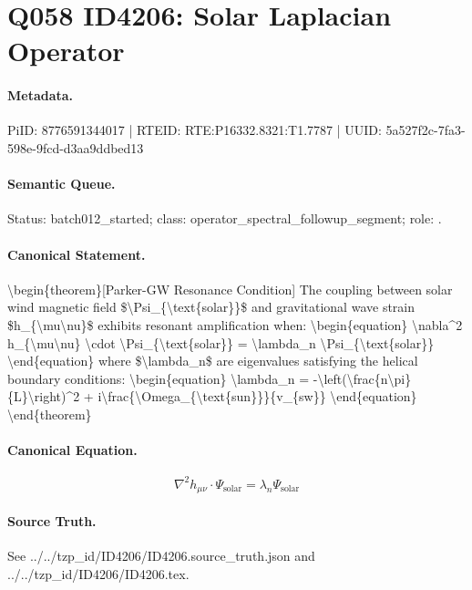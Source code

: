 \section*{Q058 ID4206: Solar Laplacian Operator}
\paragraph{Metadata.}
PiID: 8776591344017 | RTEID: RTE:P16332.8321:T1.7787 | UUID: 5a527f2c-7fa3-598e-9fcd-d3aa9ddbed13

\paragraph{Semantic Queue.}
Status: batch012\_started; class: operator\_spectral\_followup\_segment; role: .

\paragraph{Canonical Statement.}
\textbackslash{}begin\{theorem\}[Parker-GW Resonance Condition] The coupling between solar wind magnetic field \$\textbackslash{}Psi\_\{\textbackslash{}text\{solar\}\}\$ and gravitational wave strain \$h\_\{\textbackslash{}mu\textbackslash{}nu\}\$ exhibits resonant amplification when: \textbackslash{}begin\{equation\} \textbackslash{}nabla\textasciicircum{}2 h\_\{\textbackslash{}mu\textbackslash{}nu\} \textbackslash{}cdot \textbackslash{}Psi\_\{\textbackslash{}text\{solar\}\} = \textbackslash{}lambda\_n \textbackslash{}Psi\_\{\textbackslash{}text\{solar\}\} \textbackslash{}end\{equation\} where \$\textbackslash{}lambda\_n\$ are eigenvalues satisfying the helical boundary conditions: \textbackslash{}begin\{equation\} \textbackslash{}lambda\_n = -\textbackslash{}left(\textbackslash{}frac\{n\textbackslash{}pi\}\{L\}\textbackslash{}right)\textasciicircum{}2 + i\textbackslash{}frac\{\textbackslash{}Omega\_\{\textbackslash{}text\{sun\}\}\}\{v\_\{sw\}\} \textbackslash{}end\{equation\} \textbackslash{}end\{theorem\}

\paragraph{Canonical Equation.}
\[
\begin{equation} \nabla^2 h_{\mu\nu} \cdot \Psi_{\text{solar}} = \lambda_n \Psi_{\text{solar}} \end{equation}
\]

\paragraph{Source Truth.}
See ../../tzp\_id/ID4206/ID4206.source\_truth.json and ../../tzp\_id/ID4206/ID4206.tex.
